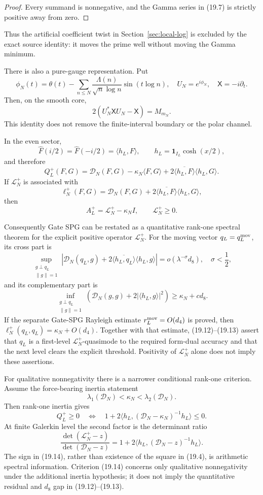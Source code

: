 \documentclass[11pt]{amsart}
\theoremstyle{definition}
\theoremstyle{remark}
\begin{document}
\begin{proof}
Every summand is nonnegative, and the Gamma series in (19.7) is strictly
positive away from zero.
\end{proof}

Thus the artificial coefficient twist in Section~\ref{sec:local-log} is
excluded by the exact source identity: it moves the prime well without
moving the Gamma minimum.

There is also a pure-gauge representation.  Put
\[
 \phi_N(t)=
 \theta(t)-\sum_{n\le N}
 \frac{\Lambda(n)}{\sqrt n\log n}\sin(t\log n),
 \quad U_N=e^{i\phi_N},
 \quad\mathsf X=-i\partial_t.
\]
Then, on the smooth core,
\[
 2(U_N^*\mathsf XU_N-\mathsf X)=M_{m_N}.
\tag{19.9}
\]
This identity does not remove the finite-interval boundary or the polar
channel.

In the even sector,
\[
 \widehat F(i/2)=\widehat F(-i/2)
 =\langle h_L,F\rangle,
 \qquad h_L=\mathbf1_{I_L}\cosh(x/2),
\]
and therefore
\[
\boxed{
 Q_L^+(F,G)
 =
 \mathcal D_N(F,G)-\kappa_N\langle F,G\rangle
 +2\overline{\langle h_L,F\rangle}\langle h_L,G\rangle.}
\tag{19.10}
\]
If \(\mathcal L_N^+\) is associated with
\[
 \ell_N^+(F,G)
 =
 \mathcal D_N(F,G)
 +2\overline{\langle h_L,F\rangle}\langle h_L,G\rangle,
\]
then
\[
\boxed{A_L^+=\mathcal L_N^+-\kappa_NI,\qquad\mathcal L_N^+\ge0.}
\tag{19.11}
\]

Consequently Gate SPG can be restated as a quantitative rank-one spectral
theorem for the explicit positive operator \(\mathcal L_N^+\).  For the moving vector
\(q_L=q_L^{\rm mov}\), its cross part is
\[
\sup_{\substack{g\perp q_L\\\|g\|=1}}
\left|
\mathcal D_N(q_L,g)
+2\overline{\langle h_L,q_L\rangle}\langle h_L,g\rangle
\right|
=o(\lambda^{-\sigma}d_8),
\quad \sigma<\frac12,
\tag{19.12}
\]
and its complementary part is
\[
\inf_{\substack{g\perp q_L\\\|g\|=1}}
\left(\mathcal D_N(g,g)+2|\langle h_L,g\rangle|^2\right)
\ge\kappa_N+cd_8.
\tag{19.13}
\]
If the separate Gate-SPG Rayleigh estimate
\(r_L^{\rm mov}=O(d_4)\) is proved, then
\(\ell_N^+(q_L,q_L)=\kappa_N+O(d_4)\).  Together with that estimate,
(19.12)--(19.13) assert that \(q_L\) is a first-level
\(\mathcal L_N^+\)-quasimode to the required form-dual accuracy and that
the next level clears the explicit threshold.  Positivity of
\(\mathcal L_N^+\) alone does not imply these assertions.

For qualitative nonnegativity there is a narrower conditional rank-one
criterion.  Assume the force-bearing inertia statement
\[
 \lambda_1(\mathcal D_N)<\kappa_N<\lambda_2(\mathcal D_N).
\]
Then rank-one inertia gives
\[
 Q_L^+\ge0
 \quad\Longleftrightarrow\quad
 1+2\langle h_L,(\mathcal D_N-\kappa_N)^{-1}h_L\rangle\le0.
\tag{19.14}
\]
At finite Galerkin level the second factor is the determinant ratio
\[
 \frac{\det(\mathcal L_N^+-z)}
 {\det(\mathcal D_N-z)}
 =
 1+2\langle h_L,(\mathcal D_N-z)^{-1}h_L\rangle.
\tag{19.15}
\]
The sign in (19.14), rather than existence of the square in (19.4), is
arithmetic spectral information.  Criterion (19.14) concerns only
qualitative nonnegativity under the additional inertia hypothesis; it does
not imply the quantitative residual and \(d_8\) gap in
(19.12)--(19.13).
\end{document}
